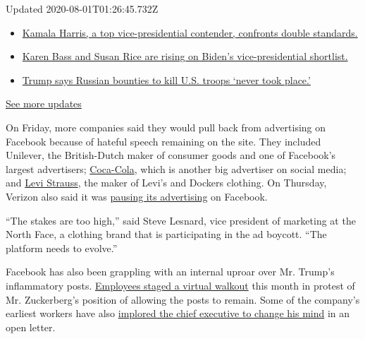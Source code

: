 Updated 2020-08-01T01:26:45.732Z

\begin{itemize}
\tightlist
\item
  \href{https://www.nytimes3xbfgragh.onion/2020/07/31/us/elections/biden-vs-trump.html?action=click\&pgtype=Article\&state=default\&region=MAIN_CONTENT_1\&context=storylines_live_updates\#link-29fdff45}{Kamala
  Harris, a top vice-presidential contender, confronts double
  standards.}
\item
  \href{https://www.nytimes3xbfgragh.onion/2020/07/31/us/elections/biden-vs-trump.html?action=click\&pgtype=Article\&state=default\&region=MAIN_CONTENT_1\&context=storylines_live_updates\#link-13ec3d9c}{Karen
  Bass and Susan Rice are rising on Biden's vice-presidential
  shortlist.}
\item
  \href{https://www.nytimes3xbfgragh.onion/2020/07/31/us/elections/biden-vs-trump.html?action=click\&pgtype=Article\&state=default\&region=MAIN_CONTENT_1\&context=storylines_live_updates\#link-49e9a016}{Trump
  says Russian bounties to kill U.S. troops `never took place.'}
\end{itemize}

\href{https://www.nytimes3xbfgragh.onion/2020/07/31/us/elections/biden-vs-trump.html?action=click\&pgtype=Article\&state=default\&region=MAIN_CONTENT_1\&context=storylines_live_updates}{See
more updates}

On Friday, more companies said they would pull back from advertising on
Facebook because of hateful speech remaining on the site. They included
Unilever, the British-Dutch maker of consumer goods and one of
Facebook's largest advertisers;
\href{https://www.cnbc.com/2020/06/26/coca-cola-pauses-advertising-on-all-social-media-platforms-globally.html?__source=twitter\%7Cmain}{Coca-Cola},
which is another big advertiser on social media; and
\href{https://twitter.com/levis/status/1276670275732398081?s=21}{Levi
Strauss}, the maker of Levi's and Dockers clothing. On Thursday, Verizon
also said it was
\href{https://www.theverge.com/2020/6/25/21303717/verison-facebook-adl-ad-boycott-instagram-north-face-rei-ben-and-jerrys}{pausing
its advertising} on Facebook.

``The stakes are too high,'' said Steve Lesnard, vice president of
marketing at the North Face, a clothing brand that is participating in
the ad boycott. ``The platform needs to evolve.''

Facebook has also been grappling with an internal uproar over Mr.
Trump's inflammatory posts.
\href{https://www.nytimes3xbfgragh.onion/2020/06/01/technology/facebook-employee-protest-trump.html}{Employees
staged a virtual walkout} this month in protest of Mr. Zuckerberg's
position of allowing the posts to remain. Some of the company's earliest
workers have also
\href{https://www.nytimes3xbfgragh.onion/2020/06/03/technology/facebook-trump-employees-letter.html}{implored
the chief executive to change his mind} in an open letter.

